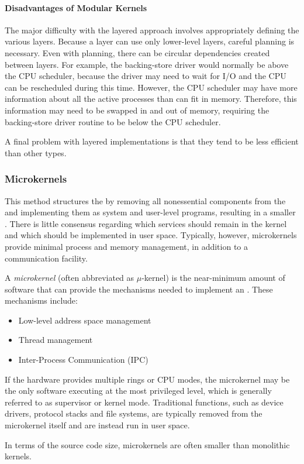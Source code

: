 \paragraph{Disadvantages of Modular Kernels}\label{par:Modular_Kernels_Disadvantages}
The major difficulty with the layered approach involves appropriately defining the various layers.
Because a layer can use only lower-level layers, careful planning is necessary.
Even with planning, there can be circular dependencies created between layers.
For example, the backing-store driver would normally be above the CPU scheduler, because the driver may need to wait for I/O and the CPU can be rescheduled during this time.
However, the CPU scheduler may have more information about all the active processes than can fit in memory.
Therefore, this information may need to be swapped in and out of memory, requiring the backing-store driver routine to be below the CPU scheduler.

A final problem with layered implementations is that they tend to be less efficient than other types.

\subsubsection{Microkernels}\label{subsubsec:Microkernels}
This method structures the  by removing all nonessential components from the  and implementing them as system and user-level programs, resulting in a smaller .
There is little consensus regarding which services should remain in the kernel and which should be implemented in user space.
Typically, however, microkernels provide minimal process and memory management, in addition to a communication facility.

\begin{definition}[Microkernel]\label{def:Microkernel}
  A \emph{microkernel} (often abbreviated as $\mu$-kernel) is the near-minimum amount of software that can provide the mechanisms needed to implement an .
  These mechanisms include:
  \begin{itemize}[noitemsep]
  \item Low-level address space management
  \item Thread management
  \item Inter-Process Communication (IPC)
  \end{itemize}

  If the hardware provides multiple rings or CPU modes, the microkernel may be the only software executing at the most privileged level, which is generally referred to as supervisor or kernel mode.
  Traditional  functions, such as device drivers, protocol stacks and file systems, are typically removed from the microkernel itself and are instead run in user space.

  In terms of the source code size, microkernels are often smaller than monolithic kernels.
\end{definition}

